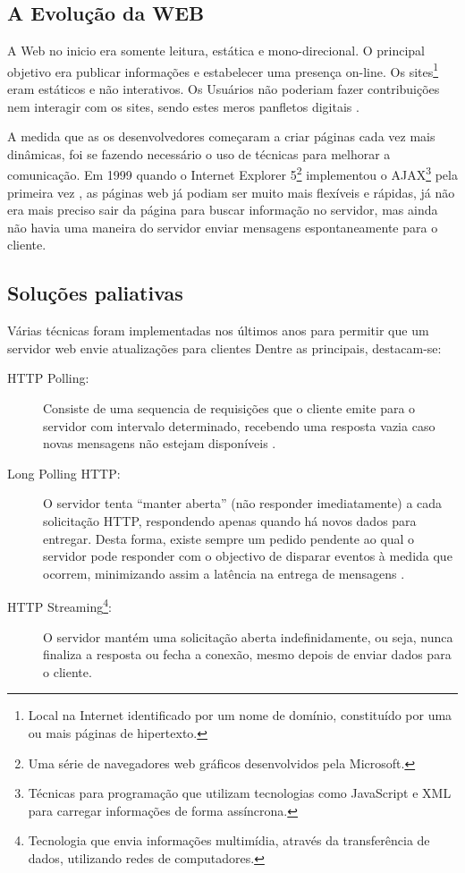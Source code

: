 \subsection{A Evolução da WEB}
A Web no inicio era somente leitura, estática e mono-direcional. O principal objetivo era publicar informações e estabelecer uma presença on-line. Os sites\footnote{Local na Internet identificado por um nome de domínio, constituído por uma ou mais páginas de hipertexto.} eram estáticos e não interativos. Os Usuários não poderiam fazer contribuições nem interagir com os sites, sendo estes meros panfletos digitais \cite[p.~2-3]{Aghaei2012}.

A medida que as os desenvolvedores começaram a criar páginas cada vez mais dinâmicas, foi se fazendo necessário o uso de técnicas para melhorar a comunicação. Em 1999 quando o Internet Explorer 5\footnote{Uma série de navegadores web gráficos desenvolvidos pela Microsoft.} implementou o AJAX\footnote{Técnicas para programação que utilizam tecnologias como JavaScript e XML para carregar informações de forma assíncrona.} pela primeira vez \cite{Asleson2006}, as páginas web já podiam ser muito mais flexíveis e rápidas, já não era mais preciso sair da página para buscar informação no servidor, mas ainda não havia uma maneira do servidor enviar mensagens espontaneamente para o cliente.

\subsection{Soluções paliativas}

Várias técnicas foram implementadas nos últimos anos para permitir que um servidor web envie atualizações para clientes Dentre as principais, destacam-se:

\begin{description}
	\item[HTTP Polling:] Consiste de uma sequencia de requisições que o cliente emite para o servidor com intervalo determinado, recebendo uma resposta vazia caso novas mensagens não estejam disponíveis \cite{Pimentel2012}.

	\item[Long Polling HTTP:] O servidor tenta “manter aberta” (não responder imediatamente) a cada solicitação HTTP, respondendo apenas quando há novos dados para entregar. Desta forma, existe sempre um pedido pendente ao qual o servidor pode responder com o objectivo de disparar eventos à medida que ocorrem, minimizando assim a latência na entrega de mensagens \cite{Aghaei2012}.

	\item[HTTP Streaming\footnote{Tecnologia que envia informações multimídia, através da transferência de dados, utilizando redes de computadores.}:] O servidor mantém uma solicitação aberta indefinidamente, ou seja, nunca finaliza a resposta ou fecha a conexão, mesmo depois de enviar dados para o cliente.
\end{description}

